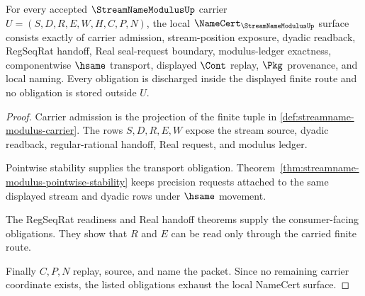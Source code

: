 \begin{theorem}
\label{thm:streamname-modulus-namecert-obligations}
For every accepted $\StreamNameModulusUp$ carrier
$U=(S,D,R,E,W,H,C,P,N)$, the local $\NameCert_{\StreamNameModulusUp}$ surface
consists exactly of carrier admission, stream-position exposure, dyadic
readback, RegSeqRat handoff, Real seal-request boundary, modulus-ledger
exactness, componentwise $\hsame$ transport, displayed $\Cont$ replay, $\Pkg$
provenance, and local naming. Every obligation is discharged inside the
displayed finite route and no obligation is stored outside $U$.
\end{theorem}
\begin{proof}
Carrier admission is the projection of the finite tuple in
\autoref{def:streamname-modulus-carrier}. The rows $S,D,R,E,W$ expose the
stream source, dyadic readback, regular-rational handoff, Real request, and
modulus ledger.

Pointwise stability supplies the transport obligation. Theorem~\ref{thm:streamname-modulus-pointwise-stability}
keeps precision requests attached to the same displayed stream and dyadic
rows under $\hsame$ movement.

The RegSeqRat readiness and Real handoff theorems supply the consumer-facing
obligations. They show that $R$ and $E$ can be read only through the carried
finite route.

Finally $C,P,N$ replay, source, and name the packet. Since no remaining carrier
coordinate exists, the listed obligations exhaust the local NameCert surface.
\end{proof}




